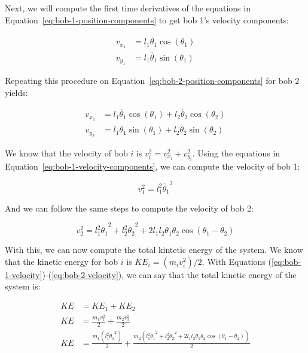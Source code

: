 Next, we will compute the first time derivatives of the equations in Equation~\ref{eq:bob-1-position-components} to get bob 1's velocity components:

\begin{equation}
    \begin{aligned}
        v_{x_1} &= l_1\dot{\theta_1}\cos\left(\theta_1\right)\\
        v_{y_1} &= l_1\dot{\theta_1}\sin\left(\theta_1\right)
    \end{aligned}
    \label{eq:bob-1-velocity-components}
\end{equation}

Repeating this procedure on Equation~\ref{eq:bob-2-position-components} for bob 2 yields:

\begin{equation}
    \begin{aligned}
        v_{x_2} &= l_1\dot{\theta_1}\cos\left(\theta_1\right) + l_2\dot{\theta_2}\cos\left(\theta_2\right)\\
        v_{y_2} &= l_1\dot{\theta_1}\sin\left(\theta_1\right) + l_2\dot{\theta_2}\sin\left(\theta_2\right)
    \end{aligned}
    \label{eq:bob-2-velocity-components}
\end{equation}

We know that the velocity of bob $i$ is $v_i^2 = v_{x_i}^2 + v_{y_i}^2$. Using the equations in Equation~\ref{eq:bob-1-velocity-components}, we can compute the velocity of bob 1:

\begin{equation}
    v_1^2 = l_1^2\dot{\theta_1}^2
    \label{eq:bob-1-velocity}
\end{equation}

And we can follow the same steps to compute the velocity of bob 2:

\begin{equation}
    v_2^2 = l_1^2\dot{\theta_1}^2 + l_2^2\dot{\theta_2}^2 + 2l_1l_2\dot{\theta_1}\dot{\theta_2}\cos\left(\theta_1 - \theta_2\right)
    \label{eq:bob-2-velocity}
\end{equation}

With this, we can now compute the total kintetic energy of the system. We know that the kinetic energy for bob $i$ is $KE_i = \left(m_i v_i^2\right)/2$. With Equations (\ref{eq:bob-1-velocity})-(\ref{eq:bob-2-velocity}), we can say that the total kinetic energy of the system is:

\begin{align*}
    KE &= KE_1 + KE_2\\
    KE &= \frac{m_1 v_1^2}{2} + \frac{m_2 v_2^2}{2}\\
    KE &= \frac{m_1 \left(l_1^2\dot{\theta_1}^2\right)}{2} + \frac{m_2 \left(l_1^2\dot{\theta_1}^2 + l_2^2\dot{\theta_2}^2 + 2l_1l_2\dot{\theta_1}\dot{\theta_2}\cos\left(\theta_1 - \theta_2\right)\right)}{2}
\end{align*}

